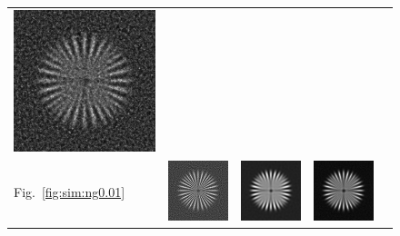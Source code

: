 \documentclass{./packages/optica-article}
\begin{document}
\begin{figure}[hbp]
\begin{tabular}[t]{l c c c c}
		\includegraphics[scale=0.25]{Simulation deconvolution/ref_ng_0.1/RL_50.png}
		\\
		Fig.~\ref{fig:sim:ng0.01}                                                       &
		\includegraphics[scale=0.25]{Simulation deconvolution/ref_ng_0.01/RIF_0.01.png} &
		\includegraphics[scale=0.25]{Simulation deconvolution/ref_ng_0.01/RIF_1.png}    &
		\includegraphics[scale=0.25]{Simulation deconvolution/ref_ng_0.01/RL_10.png}    &

\end{tabular}
\end{figure}
\end{document}
